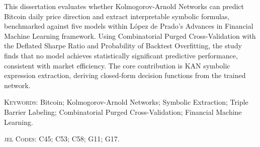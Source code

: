 \documentclass[12pt,a4paper,oneside]{article}
\begin{document}
This dissertation evaluates whether Kolmogorov-Arnold Networks can predict Bitcoin daily price direction and extract interpretable symbolic formulas, benchmarked against five models within López de Prado's Advances in Financial Machine Learning framework. Using Combinatorial Purged Cross-Validation with the Deflated Sharpe Ratio and Probability of Backtest Overfitting, the study finds that no model achieves statistically significant predictive performance, consistent with market efficiency. The core contribution is KAN symbolic expression extraction, deriving closed-form decision functions from the trained network.

\vspace{1em}

\textsc{Keywords}: Bitcoin; Kolmogorov-Arnold Networks; Symbolic Extraction; Triple Barrier Labeling; Combinatorial Purged Cross-Validation; Financial Machine Learning.

\vspace{1em}

\textsc{\gls{jel} Codes}: C45; C53; C58; G11; G17.


\newpage
\thispagestyle{plain}
\renewcommand*\contentsname{\hfill\normalfont\scshape\normalsize Table of Contents \hfill}
\tableofcontents

\newpage
\thispagestyle{plain}
\renewcommand*\listfigurename{\hfill\normalfont\scshape\normalsize List of Figures \hfill}
\listoffigures

\newpage
\thispagestyle{plain}
\renewcommand*\listtablename{\hfill\normalfont\scshape\normalsize List of Tables \hfill}
\listoftables

\end{document}
